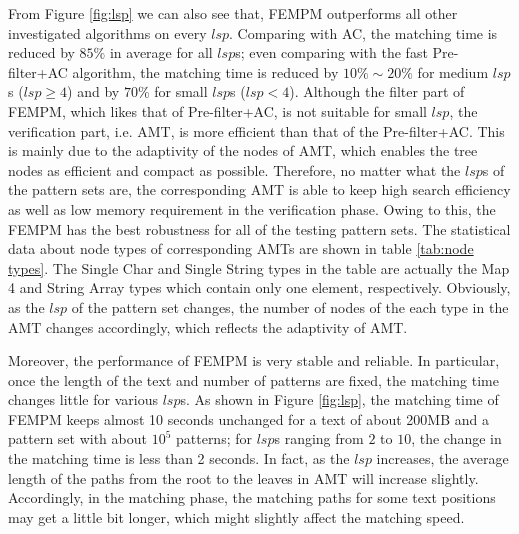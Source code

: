 From Figure \ref{fig:lsp} we can also see that, \textsf{FEMPM}
outperforms all other investigated algorithms on every
$lsp$. Comparing with \textsf{AC}, the matching time is reduced by
$85\%$ in average for all $lsp$s; even comparing with the fast
\textsf{Pre-filter+AC} algorithm, the matching time is reduced by
$10\% \sim 20\%$ for medium $lsp$s ($lsp \geq 4$) and by $70\%$ for
small $lsp$s ($lsp < 4$). Although the filter part of \textsf{FEMPM},
which likes that of \textsf{Pre-filter+AC}, is not suitable for small
$lsp$, the verification part, i.e. AMT, is more efficient than that of
the \textsf{Pre-filter+AC}. This is mainly due to the adaptivity of
the nodes of AMT, which enables the tree nodes as efficient and
compact as possible. Therefore, no matter what the $lsp$s of the
pattern sets are, the corresponding AMT is able to keep high search
efficiency as well as low memory requirement in the verification
phase. Owing to this, the \textsf{FEMPM} has the best robustness for
all of the testing pattern sets. The statistical data about node types
of corresponding AMTs are shown in table \ref{tab:node types}. The
Single Char and Single String types in the table are actually the Map
4 and String Array types which contain only one element,
respectively. Obviously, as the $lsp$ of the pattern set changes, the
number of nodes of the each type in the AMT changes accordingly, which
reflects the adaptivity of AMT.

Moreover, the performance of \textsf{FEMPM} is very stable and
reliable. In particular, once the length of the text and number of
patterns are fixed, the matching time changes little for various
$lsp$s. As shown in Figure \ref{fig:lsp}, the matching time of
\textsf{FEMPM} keeps almost 10 seconds unchanged for a text of about
200MB and a pattern set with about $10^5$ patterns; for $lsp$s ranging
from $2$ to $10$, the change in the matching time is less than 2
seconds. In fact, as the $lsp$ increases, the average length of the
paths from the root to the leaves in AMT will increase
slightly. Accordingly, in the matching phase, the matching paths for
some text positions may get a little bit longer, which might slightly
affect the matching speed.

